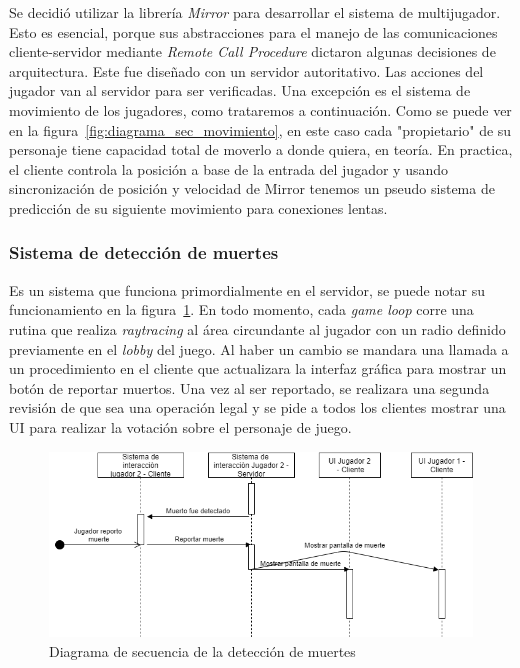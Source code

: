 Se decidió utilizar la librería \textit{Mirror} para desarrollar el sistema de multijugador. Esto es esencial, porque sus abstracciones para el manejo de las comunicaciones cliente-servidor mediante \textit{Remote Call Procedure} dictaron algunas decisiones de arquitectura.
Este fue diseñado con un servidor autoritativo. Las acciones del jugador van al servidor para ser verificadas. Una excepción es el sistema de movimiento de los jugadores, como trataremos a continuación. Como se puede ver en la figura~\ref{fig:diagrama_sec_movimiento}, en este caso cada "propietario" de su personaje tiene capacidad total de moverlo a donde quiera, en teoría. En practica, el cliente controla la posición a base de la entrada del jugador y usando sincronización de posición y velocidad de Mirror tenemos un pseudo sistema de predicción de su siguiente movimiento para conexiones lentas. 

\subsubsection{Sistema de detección de muertes}
Es un sistema que funciona primordialmente en el servidor, se puede notar su funcionamiento en la figura~\ref{fig:diagrama_sec_detect_muertes}. En todo momento, cada \textit{game loop} corre una rutina que realiza \textit{raytracing} al área circundante al jugador con un radio definido previamente en el \textit{lobby} del juego. Al haber un cambio se mandara una llamada a un procedimiento en el cliente que actualizara la interfaz gráfica para mostrar un botón de reportar muertos. Una vez al ser reportado, se realizara una segunda revisión de que sea una operación legal y se pide a todos los clientes mostrar una UI para realizar la votación sobre el personaje de juego.
\begin{figure}[h!]
    \centering
    \includegraphics[width=1\linewidth]{images/diagrama_deteccion_muerte.png}
    \caption{Diagrama de secuencia de la detección de muertes}
    \label{fig:diagrama_sec_detect_muertes}
\end{figure}

